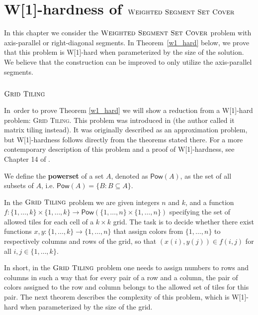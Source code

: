 \chapter{W[1]-hardness of $\textsc{Weighted Segment Set Cover}$}
\label{chapter:w1_hard}

In this chapter we consider the $\textsc{Weighted Segment Set Cover}$ problem with 
axis-parallel or right-diagonal segments.
In Theorem~\ref{w1_hard} below, we prove that this problem is 
W[1]-hard when parameterized by the size of the solution.
We believe that the construction can be improved to only
utilize the axis-parallel segments.

\wOneHard*

\newcommand{\GridTiling}{\textsc{Grid Tiling}}

\section{$\GridTiling$}

In~order to prove Theorem \ref{w1_hard}
we will show a reduction from a W[1]-hard problem:
\textsc{Grid} \textsc{Tiling}.
This problem was introduced in \cite{marx_grid_tiling}
(the author called it matrix tiling instead).
It was originally described as an approximation problem,
but W[1]-hardness follows directly from the theorems stated there.
For a more contemporary description of this problem
and a proof of W[1]-hardness, see Chapter 14 of \cite{platypus_book}.

\newcommand{\pow}{\mathsf{Pow}}

\begin{defi}
We define the \textbf{powerset} of a set $A$, denoted as $\pow(A)$,
as the set of all subsets of $A$, i.e. $\pow(A) = \{B : B \subseteq A\}$.
\end{defi}

\begin{defi}
In the \textbf{$\GridTiling$} problem we are given integers $n$ and $k$,
and a function
$f : \{1, \ldots, k\} \times \{1, \ldots, k\} \rightarrow \pow(\{1, \ldots, n\} \times \{1, \ldots, n\})$
specifying the set of allowed tiles for each cell of a $k \times k$ grid.
The task is to decide whether there exist functions
$x,y : \{1, \ldots, k\} \rightarrow \{1, \ldots, n\}$
that assign colors from $\{1, \ldots, n\}$
to respectively columns and rows of the grid,
so that $(x(i), y(j)) \in f(i, j)$ for all $i,j \in \{1, \ldots, k\}$.
\end{defi}

In short, in the $\GridTiling$ problem one needs to assign numbers
to rows and columns in such a way
that for every pair of a row and a column,
the pair of colors assigned
to the row and column 
belongs to the allowed set of tiles for this pair.
The next theorem describes the complexity of this problem,
which is W[1]-hard when parameterized by the size of the grid.


